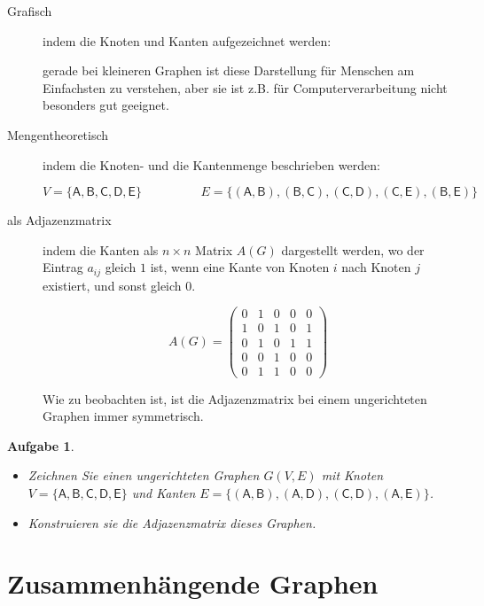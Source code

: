 \documentclass[12pt,a4paper]{report}
\theoremstyle{break}
\newtheorem{exercise}{Aufgabe}[section]
\begin{document}
\begin{description}
\item[Grafisch] indem die Knoten und Kanten aufgezeichnet werden:


gerade bei kleineren Graphen ist diese Darstellung f\"{u}r Menschen am
Einfachsten zu verstehen, aber sie ist z.B. f\"{u}r
Computerverarbeitung nicht besonders gut geeignet.
\item[Mengentheoretisch] indem die Knoten- und die Kantenmenge
  beschrieben werden:

\begin{displaymath}
V = \{\mathsf{A,B,C,D,E}\}\hspace{2cm}E = \{\mathsf{(A,B), (B,C),
  (C,D), (C,E), (B,E)}\}
\end{displaymath}

\item[\textnormal{als} Adjazenzmatrix] indem die Kanten als $n\times{n}$ Matrix $A(G)$
  dargestellt werden, wo der Eintrag $a_{ij}$ gleich $1$ ist, wenn eine Kante
  von Knoten $i$ nach Knoten $j$ existiert, und sonst gleich $0$.

\begin{displaymath}
A(G) = \left( 
\begin{array}{ccccc}
0 & 1 & 0 & 0 & 0 \\
1 & 0 & 1 & 0 & 1 \\
0 & 1 & 0 & 1 & 1 \\
0 & 0 & 1 & 0 & 0 \\
0 & 1 & 1 & 0 & 0 
\end{array}
\right)
\end{displaymath}

Wie zu beobachten ist, ist die Adjazenzmatrix bei einem ungerichteten
Graphen immer symmetrisch.
\end{description}

\begin{exercise}
\begin{itemize}
\item Zeichnen Sie einen ungerichteten Graphen $G(V,E)$ mit Knoten 
$V = \{\mathsf{A,B,C,D,E}\}$ und Kanten 
$E = \{\mathsf{(A, B), (A, D), (C, D), (A, E)}\}$.
\item Konstruieren sie die Adjazenzmatrix dieses Graphen.
\end{itemize}
\end{exercise}

\section{Zusammenh\"{a}ngende Graphen}
\end{document}
